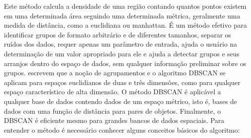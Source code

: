 Este método calcula a densidade de uma região contando quantos pontos existem em uma determinada área seguindo uma determinada métrica, geralmente uma medida de distância, como a euclidiana ou manhattan. 
É um método efetivo para identificar grupos de formato arbitrário e de diferentes tamanhos, separar os ruídos dos dados, requer apenas um parâmetro de entrada, ajuda o usuário na determinação de um valor apropriado para ele e ajuda a detectar grupos e seus arranjos dentro do espaço de dados, sem qualquer informação preliminar sobre os grupos.
\cite{ESTER1996}  escrevem que a noção de agrupamentos e o algoritmo DBSCAN se aplicam para espaços euclidianos de duas e três dimensões, como para qualquer espaço característico de alta dimensão. O método DBSCAN é aplicável a qualquer base de dados contendo dados de um espaço métrico, isto é, bases de dados com uma função de distância para pares de objetos. Finalmente, o DBSCAN é eficiente mesmo para grandes bancos de dados espaciais.
Para entender o método é necessário conhecer alguns conceitos básicos do algoritmo: 

